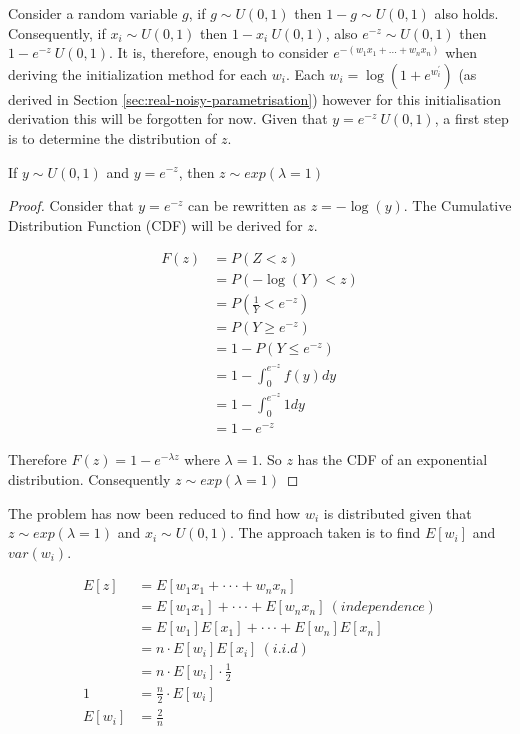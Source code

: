 Consider a random variable $g$, if $g \sim U(0,1)$ then $1 - g \sim U(0,1)$ also holds. Consequently, if $x_i \sim U(0,1)$ then $1 - x_i ~ U(0,1)$, also $e^{-z} \sim U(0,1)$ then $1 - e^{-z} ~ U(0,1)$. It is, therefore, enough to consider $e^{-(w_1x_1 + ... + w_nx_n)}$ when deriving the initialization method for each $w_i$. Each $w_i = \log(1 + e^{w^{'}_i})$ (as derived in Section \ref{sec:real-noisy-parametrisation}) however for this initialisation derivation this will be forgotten for now. Given that $y = e^{-z} ~ U(0,1)$, a first step is to determine the distribution of $z$.\\
\begin{theorem}
	If $y \sim U(0,1)$ and $y = e^{-z}$, then $z \sim exp(\lambda = 1)$
\end{theorem}
\begin{proof}
	Consider that $y = e^{-z}$ can be rewritten as $z = -\log(y)$. The Cumulative Distribution Function (CDF) will be derived for $z$.
	
	\begin{align*}
	F(z) &= P(Z < z)\\
	&= P(-\log(Y) < z)\\
	&= P(\frac{1}{Y} < e^{-z})\\
	&= P(Y \geq e^{-z})\\
	&= 1 - P(Y \leq e^{-z})\\
	&= 1 - \int_{0}^{e^{-z}} f(y) dy\\
	&= 1 - \int_{0}^{e^{-z}} 1 dy\\
	&= 1 - e^{-z}
	\end{align*}
	
	Therefore $F(z) = 1 - e^{-\lambda z}$ where $\lambda = 1$. So $z$ has the CDF of an exponential distribution. Consequently $z \sim exp(\lambda = 1)$
\end{proof}

The problem has now been reduced to find how $w_i$ is distributed given that $z \sim exp(\lambda = 1)$ and $x_i \sim U(0,1)$. The approach taken is to find $E[w_i]$ and $var(w_i)$.

\begin{align*}
E[z] &= E[w_1x_1 + \cdot \cdot \cdot + w_nx_n]\\
&= E[w_1x_1] + \cdot \cdot \cdot + E[w_nx_n]\ (independence)\\
&= E[w_1]E[x_1] + \cdot \cdot \cdot + E[w_n]E[x_n]\\
&= n \cdot E[w_i]E[x_i]\ (i.i.d)\\
&= n \cdot E[w_i] \cdot \frac{1}{2}\\
1 &= \frac{n}{2} \cdot E[w_i]\\
E[w_i] &= \frac{2}{n}
\end{align*}

